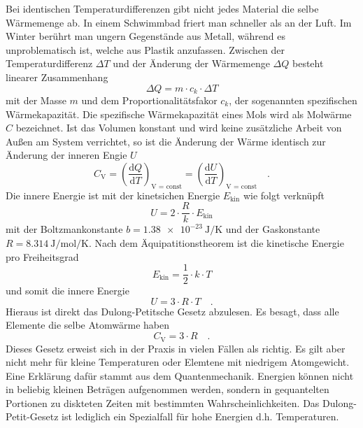 Bei identischen Temperaturdifferenzen gibt nicht jedes Material die selbe Wärmemenge ab. In einem Schwimmbad friert man schneller als an der Luft. Im Winter berührt man ungern Gegenstände aus Metall, während es unproblematisch ist, welche aus Plastik anzufassen.
Zwischen der Temperaturdifferenz $\Delta T$ und der Änderung der Wärmemenge $\Delta Q$ besteht linearer Zusammenhang
\begin{equation}
  \Delta Q = m \cdot c_k \cdot \Delta T
\end{equation}
mit der Masse $m$ und dem Proportionalitätsfakor $c_k$, der sogenannten spezifischen Wärmekapazität.
Die spezifische Wärmekapazität eines Mols wird als Molwärme $C$ bezeichnet. Ist das Volumen konstant und wird keine zusätzliche Arbeit von Außen am System verrichtet, so ist die Änderung der Wärme identisch zur Änderung der inneren Engie $U$
\begin{equation}
  C_\text{V} = \left(\frac{\text{d} Q}{\text{d} T} \right)_\text{V = const}= \left(\frac{\text{d} U}{\text{d} T} \right)_\text{V = const} \quad.
\end{equation}
Die innere Energie ist mit der kinetsichen Energie $E_\text{kin}$ wie folgt verknüpft
\begin{equation}
  U = 2 \cdot \frac{R}{k} \cdot E_\text{kin}
\end{equation}
mit der Boltzmankonstante $b = \SI{1.38e-23}{\joule\per\kelvin}$ und der Gaskonstante $R = \SI{8.314}{\joule\per\mol\per\kelvin}$.
Nach dem Äquipatitionstheorem ist die kinetische Energie pro Freiheitsgrad
\begin{equation}
E_\text{kin}=\frac{1}{2}\cdot k \cdot T
\end{equation}
und somit die innere Energie
\begin{equation}
U = 3 \cdot R \cdot T \quad.
\end{equation}
Hieraus ist direkt das Dulong-Petitsche Gesetz abzulesen. Es besagt, dass alle Elemente die selbe Atomwärme haben
\begin{equation}
  C_\text{V} = 3 \cdot R \quad.
\end{equation}
Dieses Gesetz erweist sich in der Praxis in vielen Fällen als richtig. Es gilt aber nicht mehr für kleine Temperaturen oder Elemtene mit niedrigem Atomgewicht. Eine Erklärung dafür stammt aus dem Quantenmechanik. Energien können nicht in beliebig kleinen Beträgen aufgenommen werden, sondern in gequantelten Portionen zu diskteten Zeiten mit bestimmten Wahrscheinlichkeiten. Das Dulong-Petit-Gesetz ist lediglich ein Spezialfall für hohe Energien d.h. Temperaturen. \\

